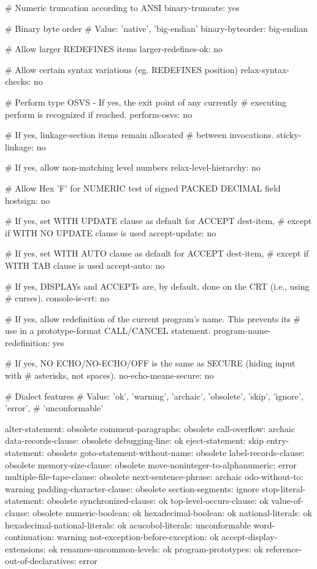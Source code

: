 # Numeric truncation according to ANSI
binary-truncate:		yes

# Binary byte order
# Value: 'native', 'big-endian'
binary-byteorder:		big-endian

# Allow larger REDEFINES items
larger-redefines-ok:		no

# Allow certain syntax variations (eg. REDEFINES position)
relax-syntax-checks:		no

# Perform type OSVS - If yes, the exit point of any currently
# executing perform is recognized if reached.
perform-osvs:			no

# If yes, linkage-section items remain allocated
# between invocations.
sticky-linkage:			no

# If yes, allow non-matching level numbers
relax-level-hierarchy:		no

# Allow Hex 'F' for NUMERIC test of signed PACKED DECIMAL field
hostsign:			no

# If yes, set WITH UPDATE clause as default for ACCEPT dest-item,
# except if WITH NO UPDATE clause is used
accept-update:			no

# If yes, set WITH AUTO clause as default for ACCEPT dest-item,
# except if WITH TAB clause is used
accept-auto:			no

# If yes, DISPLAYs and ACCEPTs are, by default, done on the CRT (i.e., using
# curses).
console-is-crt:			no

# If yes, allow redefinition of the current program's name. This prevents its
# use in a prototype-format CALL/CANCEL statement.
program-name-redefinition:	yes

# If yes, NO ECHO/NO-ECHO/OFF is the same as SECURE (hiding input with
# asterisks, not spaces).
no-echo-means-secure:		no

# Dialect features
# Value: 'ok', 'warning', 'archaic', 'obsolete', 'skip', 'ignore', 'error',
#        'unconformable'

alter-statement:			obsolete
comment-paragraphs:			obsolete
call-overflow:				archaic
data-records-clause:			obsolete
debugging-line:				ok
eject-statement:			skip
entry-statement:			obsolete
goto-statement-without-name:		obsolete
label-records-clause:			obsolete
memory-size-clause:			obsolete
move-noninteger-to-alphanumeric:	error
multiple-file-tape-clause:		obsolete
next-sentence-phrase:			archaic
odo-without-to:				warning
padding-character-clause:		obsolete
section-segments:			ignore
stop-literal-statement:			obsolete
synchronized-clause:			ok
top-level-occurs-clause:		ok
value-of-clause:			obsolete
numeric-boolean:			ok
hexadecimal-boolean:			ok
national-literals:			ok
hexadecimal-national-literals:			ok
acucobol-literals:			unconformable
word-continuation:			warning
not-exception-before-exception:		ok
accept-display-extensions:		ok
renames-uncommon-levels:		ok
program-prototypes:			ok
reference-out-of-declaratives:		error

